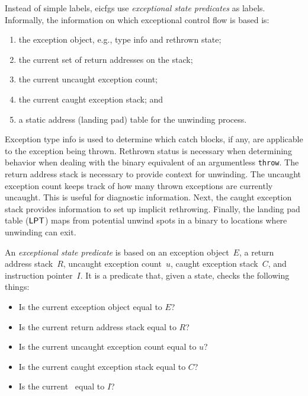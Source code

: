 Instead of simple labels, \acp{eicfg} use \emph{exceptional state predicates} as labels.
Informally, the information on which exceptional control flow is based is:
\begin{enumerate}
  \item the exception object, e.g., type info and rethrown state;
  \item the current set of return addresses on the stack;
  \item the current uncaught exception count;
  \item the current caught exception stack; and
  \item a static address (landing pad) table for the unwinding process.
\end{enumerate}
Exception type info is used to determine which catch blocks, if any, are applicable to the exception being thrown.
Rethrown status is necessary when determining behavior when dealing with the binary equivalent of an argumentless \lstinline|throw|.
The return address stack is necessary to provide context for unwinding.
The uncaught exception count keeps track of how many thrown exceptions are currently uncaught.
This is useful for diagnostic information.
Next, the caught exception stack provides information to set up implicit rethrowing.
Finally, the landing pad table ($\operatorname{\mathsf{LPT}}$) maps from potential unwind spots in a binary to locations where unwinding can exit.

\begin{definition}
  An \emph{exceptional state predicate} is based on an exception object~$E$, a return address stack~$R$, uncaught exception count~$u$, caught exception stack~$C$, and instruction pointer~$I$.
  It is a predicate that, given a state, checks the following things:
  \begin{itemize}
    \item Is the current exception object equal to $E$?
    \item Is the current return address stack equal to $R$?
    \item Is the current uncaught exception count equal to $u$?
    \item Is the current caught exception stack equal to $C$?
    \item Is the current \rip\ equal to $I$?
  \end{itemize}
\end{definition}

